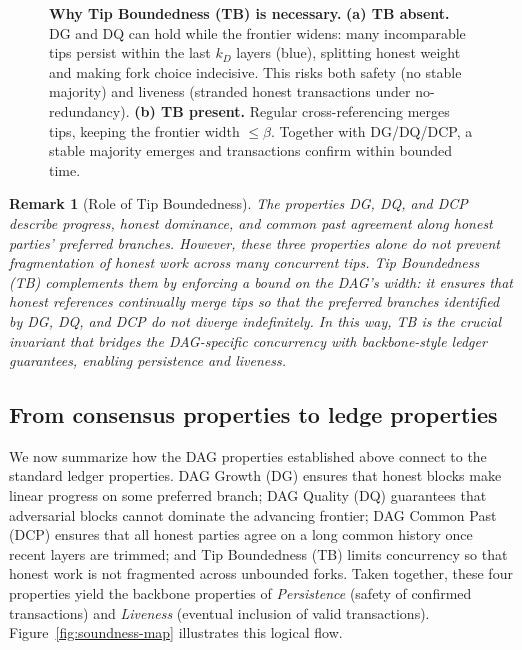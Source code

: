 \documentclass[11pt]{article}
\newtheorem{remark}[theorem]{Remark}
\begin{document}
\begin{figure}[htp!]
\caption{\textbf{Why Tip Boundedness (TB) is necessary.}
\small
\textbf{(a) TB absent.} DG and DQ can hold while the frontier widens: many incomparable tips persist
within the last $k_D$ layers (blue), splitting honest weight and making fork choice indecisive. This risks
both safety (no stable majority) and liveness (stranded honest transactions under no-redundancy).
\textbf{(b) TB present.} Regular cross-referencing merges tips, keeping the frontier width $\le \beta$.
Together with DG/DQ/DCP, a stable majority emerges and transactions confirm within bounded time.}
\label{fig:tb-necessity}
\end{figure}



\begin{remark}[Role of Tip Boundedness]
The properties DG, DQ, and DCP describe progress,
honest dominance, and common past agreement along honest parties’ preferred branches.
However, these three properties alone do not prevent fragmentation of honest work
across many concurrent tips.
Tip Boundedness (TB) complements them by enforcing a bound on the DAG’s width:
it ensures that honest references continually merge tips so that the preferred branches
identified by DG, DQ, and DCP do not diverge indefinitely.
In this way, TB is the crucial invariant that bridges the DAG-specific concurrency
with backbone-style ledger guarantees, enabling persistence and liveness.
\end{remark}


\subsection{From consensus properties to ledge properties}
We now summarize how the DAG properties established above connect to the standard ledger
properties. DAG Growth (DG) ensures that honest blocks make linear progress on some preferred
branch; DAG Quality (DQ) guarantees that adversarial blocks cannot dominate the advancing
frontier; DAG Common Past (DCP) ensures that all honest parties agree on a long common
history once recent layers are trimmed; and Tip Boundedness (TB) limits concurrency so that
honest work is not fragmented across unbounded forks. Taken together, these four properties
yield the backbone properties of \emph{Persistence} (safety of confirmed transactions) and
\emph{Liveness} (eventual inclusion of valid transactions). Figure~\ref{fig:soundness-map}
illustrates this logical flow.
\end{document}
